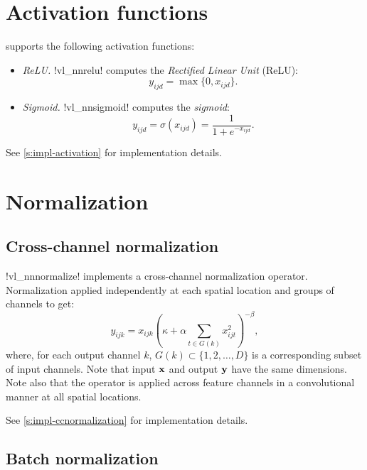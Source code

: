 \section{Activation functions}\label{s:activation}

\matconvnet supports the following activation functions:
%
\begin{itemize}
\item \emph{ReLU.} !vl_nnrelu! computes the \emph{Rectified Linear Unit} (ReLU):
\[
 y_{ijd} = \max\{0, x_{ijd}\}.
\]

\item \emph{Sigmoid.} !vl_nnsigmoid! computes the \emph{sigmoid}:
\[
 y_{ijd} = \sigma(x_{ijd}) = \frac{1}{1+e^{-x_{ijd}}}.
\]
\end{itemize}
%
See \autoref{s:impl-activation} for implementation details.

\section{Normalization}\label{s:normalization}

\subsection{Cross-channel normalization}\label{s:ccnormalization}

!vl_nnnormalize! implements a cross-channel normalization operator. Normalization applied independently at each spatial location and groups of channels to get:
\[
 y_{ijk} = x_{ijk} \left( \kappa + \alpha \sum_{t\in G(k)} x_{ijt}^2 \right)^{-\beta},
\]
where, for each output channel $k$, $G(k) \subset \{1, 2, \dots, D\}$ is a corresponding subset of input channels. Note that input $\mathbf{x}$ and output $\mathbf{y}$ have the same dimensions. Note also that the operator is applied across feature channels in a convolutional manner at all spatial locations.

See \autoref{s:impl-ccnormalization} for implementation details.

\subsection{Batch normalization}\label{s:bnorm}

